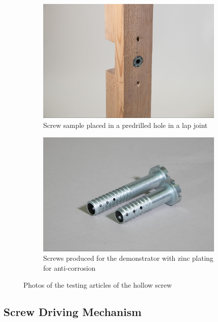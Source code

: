 \begin{figure}[!h]
\begin{subfigure}[b]{0.49\textwidth}
        \centering
        \includegraphics[width=\textwidth]{images/7a/img32.jpg}
        \caption{Screw sample placed in a predrilled hole in a lap joint}
    \end{subfigure}
    \hfill
    \begin{subfigure}[b]{0.49\textwidth}
        \centering
        \includegraphics[width=\textwidth]{images/7a/img33.jpg}
        \caption{Screws produced for the demonstrator with zinc plating for anti-corrosion} 
    \end{subfigure}
    \caption{Photos of the testing articles of the hollow screw}
    \label{fig:hollow-screw-test}
\end{figure}

\subsection{Screw Driving Mechanism}
\label{subsection:exploration-4-screw-driving-mechanism}

